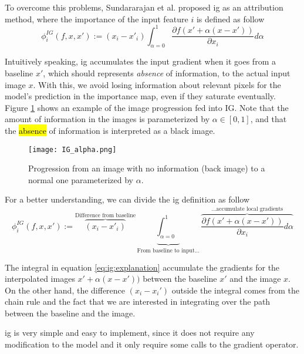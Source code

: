 To overcome this problems, Sundararajan et al. proposed \gls{ig} as an attribution method, where the importance of the input feature $i$ is defined as follow
\begin{equation}
  \phi^{IG}_i(f, x, x') := (x_{i} - x'_{i})\int_{\alpha=0}^1\frac{\partial f(x'+\alpha (x - x'))}{\partial x_i}{d\alpha}
  \label{eq:ig:definition}
\end{equation}

Intuitively speaking, \gls{ig} accumulates the input gradient when it goes from a baseline $x'$, which should represents \textit{absence} of information, to the actual input image $x$. With this, we avoid losing information about relevant pixels for the model's prediction in the importance map, even if they saturate eventually. Figure \ref{fig:basics:IG_image_prog} shows an example of the image progression fed into IG. Note that the amount of information in the images is parameterized by $\alpha \in [0,1]$, and that the \hl{absence} of information is interpreted as a black image.

\begin{figure}[!ht]
  \centering
  \texttt{[image: IG\_alpha.png]}
  \caption{Progression from an image with no information (back image) to a normal one parameterized by $\alpha$.}
  \label{fig:basics:IG_image_prog}
\end{figure}

For a better understanding, we can divide the \gls{ig} definition as follow
\begin{equation}
  \phi^{IG}_i(f, x, x') := \overbrace{(x_{i} - x'_{i})}^\text{Difference from baseline}
  \underbrace{\int_{\alpha=0}^1}_\text{From baseline to input...}
  \overbrace{\frac{\partial f(x'+\alpha (x - x'))}{\partial x_i}{d\alpha}}^\text{…accumulate local gradients}
  \label{eq:ig:explanation}
\end{equation}

The integral in equation \ref{eq:ig:explanation} accumulate the gradients for the interpolated images $x'+\alpha (x - x'))$ between the baseline $x'$ and the image $x$. On the other hand, the difference $(x_i - x_i')$ outside the integral comes from the chain rule and the fact that we are interested in integrating over the path between the baseline and the image.

\gls{ig} is very simple and easy to implement, since it does not require any modification to the model and it only require some calls to the gradient operator.

